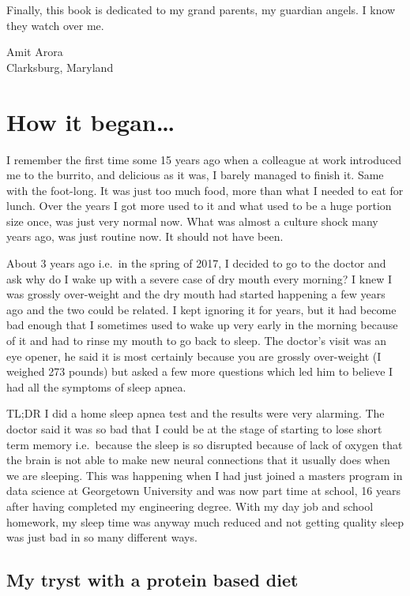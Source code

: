 \documentclass[
  oneside]{book}
\begin{document}
Finally, this book is dedicated to my grand parents, my guardian angels. I know they watch over me.

Amit Arora\\
Clarksburg, Maryland

\hypertarget{how-it-began}{%
\chapter{How it began\ldots{}}\label{how-it-began}}

I remember the first time some 15 years ago when a colleague at work introduced me to the burrito, and delicious as it was, I barely managed to finish it. Same with the foot-long. It was just too much food, more than what I needed to eat for lunch. Over the years I got more used to it and what used to be a huge portion size once, was just very normal now. What was almost a culture shock many years ago, was just routine now. It should not have been.

About 3 years ago i.e.~in the spring of 2017, I decided to go to the doctor and ask why do I wake up with a severe case of dry mouth every morning? I knew I was grossly over-weight and the dry mouth had started happening a few years ago and the two could be related. I kept ignoring it for years, but it had become bad enough that I sometimes used to wake up very early in the morning because of it and had to rinse my mouth to go back to sleep. The doctor's visit was an eye opener, he said it is most certainly because you are grossly over-weight (I weighed 273 pounds) but asked a few more questions which led him to believe I had all the symptoms of sleep apnea.

TL;DR I did a home sleep apnea test and the results were very alarming. The doctor said it was so bad that I could be at the stage of starting to lose short term memory i.e.~because the sleep is so disrupted because of lack of oxygen that the brain is not able to make new neural connections that it usually does when we are sleeping. This was happening when I had just joined a masters program in data science at Georgetown University and was now part time at school, 16 years after having completed my engineering degree. With my day job and school homework, my sleep time was anyway much reduced and not getting quality sleep was just bad in so many different ways.

\hypertarget{my-tryst-with-a-protein-based-diet}{%
\section{My tryst with a protein based diet}\label{my-tryst-with-a-protein-based-diet}}
\end{document}

